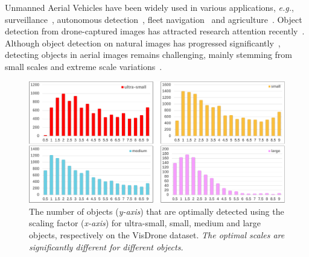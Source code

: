 \documentclass[letterpaper]{article} %
\def \eg {\emph{e.g.}}
\newcommand\rjf[1]{\textcolor{red}{\{RJF: #1\}}}
\newcommand\qz[1]{\textcolor{blue}{\{QZ: #1\}}}
\begin{document}
Unmanned Aerial Vehicles have been widely used in various applications, \eg, surveillance~\cite{Yun_2022_surveillance}, autonomous detection~\cite{REN_2017_UAVDetection, REN_2021_UAVDetection}, fleet navigation~\cite{Alami_2023_FleetNavigation} and agriculture~\cite{Tokekar_2016_agriculture}. %
Object detection from drone-captured images has attracted research attention recently~\cite{Xi_2021_SeanHE, Yue_2020_SeanHe, Bouguettaya_2022_review}. %
Although object detection on natural images has progressed significantly~\cite{Ge_2021_YOLOX}, detecting objects in aerial images remains challenging, mainly stemming from small scales and extreme scale variations~\cite{Deng_2021_GLSAN, Xu_2022_AdaZoom}. 

\begin{figure}[t]
	\centering
	\centerline{\includegraphics[width= 1\columnwidth]{./images/Intro1.pdf}}
	\caption{%
 The number of objects (\textit{y-axis}) that are optimally detected using the scaling factor (\textit{x-axis}) for ultra-small, small, medium and large objects, respectively on the VisDrone dataset. \textit{The optimal scales are significantly different for different objects.}%
 }
	\label{fig: intro}
\end{figure}
\end{document}

